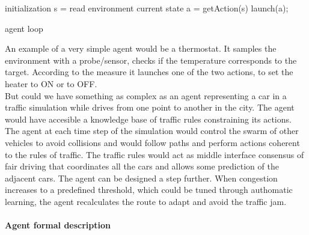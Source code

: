 \documentclass{report}
\begin{document}
\begin{algorithm}[H]
\SetAlgoLined
	initialization\;
	{
		s = read environment current state\;
		a = getAction(s)\;
		launch(a);
	}
\caption{agent loop}
\end{algorithm}

An example of a very simple agent would be a thermostat. It samples the environment with a probe/sensor, 
checks if the temperature corresponds to the target. According to the measure it launches one of the two 
actions, to set the heater to ON or to OFF.\\
But could we have something as complex as an agent representing a car in a traffic simulation while drives 
from one point to another in the city. The agent would have accesible a knowledge base of traffic rules 
constraining its actions. The agent at each time step of the simulation would control the swarm of other 
vehicles to avoid collisions and would follow paths and perform actions coherent to the rules of traffic. 
The traffic rules would act as middle interface consensus of fair driving that coordinates all the cars 
and allows some prediction of the adjacent cars. The agent can be designed a step further. When congestion 
increases to a predefined threshold, which could be tuned through authomatic learning, the agent recalculates 
the route to adapt and avoid the traffic jam.


\paragraph{Agent formal description}
	
\end{document}

